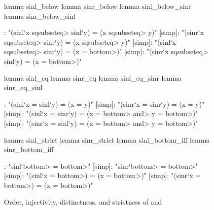 \begin{figure}
\begin{minipage}{0.275\linewidth}
\begin{isabelle}
lemma sinl_below
lemma sinr_below
lemma sinl_below_sinr
lemma sinr_below_sinl
\end{isabelle}
\end{minipage}
\begin{minipage}{0.7\linewidth}
\begin{isabelle}
[simp]: "(sinl`x \<sqsubseteq> sinl`y) = (x \<sqsubseteq> y)"
[simp]: "(sinr`x \<sqsubseteq> sinr`y) = (x \<sqsubseteq> y)"
[simp]: "(sinl`x \<sqsubseteq> sinr`y) = (x = \<bottom>)"
[simp]: "(sinr`x \<sqsubseteq> sinl`y) = (x = \<bottom>)"
\end{isabelle}
\end{minipage}

\begin{minipage}{0.275\linewidth}
\begin{isabelle}
lemma sinl_eq
lemma sinr_eq
lemma sinl_eq_sinr
lemma sinr_eq_sinl
\end{isabelle}
\end{minipage}
\begin{minipage}{0.7\linewidth}
\begin{isabelle}
[simp]: "(sinl`x = sinl`y) = (x = y)"
[simp]: "(sinr`x = sinr`y) = (x = y)"
[simp]: "(sinl`x = sinr`y) = (x = \<bottom> \<and> y = \<bottom>)"
[simp]: "(sinr`x = sinl`y) = (x = \<bottom> \<and> y = \<bottom>)"
\end{isabelle}
\end{minipage}

\begin{minipage}{0.275\linewidth}
\begin{isabelle}
lemma sinl_strict
lemma sinr_strict
lemma sinl_bottom_iff
lemma sinr_bottom_iff
\end{isabelle}
\end{minipage}
\begin{minipage}{0.7\linewidth}
\begin{isabelle}
[simp]: "sinl`\<bottom> = \<bottom>"
[simp]: "sinr`\<bottom> = \<bottom>"
[simp]: "(sinl`x = \<bottom>) = (x = \<bottom>)"
[simp]: "(sinr`x = \<bottom>) = (x = \<bottom>)"
\end{isabelle}
\end{minipage}
\caption{Order, injectivity, distinctness, and strictness of  and }
\label{fig:holcf-sinl-sinr}
\end{figure}
 
